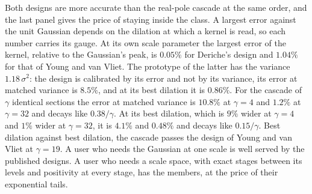 \begin{example}
Both designs are more accurate than the real-pole cascade at the same order, and the last
panel gives the price of staying inside the class. A largest error against the unit Gaussian
depends on the dilation at which a kernel is read, so each number carries its gauge. At its
own scale parameter the largest error of the kernel, relative to the Gaussian's peak, is
$0.05\%$ for Deriche's design and $1.04\%$ for that of Young and van Vliet. The prototype of
the latter has the variance $1.18\,\sigma^2$: the design is calibrated by its error and not by
its variance, its error at matched variance is $8.5\%$, and at its best dilation it is
$0.86\%$. For the cascade of $\gamma$ identical sections the error at matched variance is
$10.8\%$ at $\gamma = 4$ and $1.2\%$ at $\gamma = 32$ and decays like $0.38/\gamma$. At its
best dilation, which is $9\%$ wider at $\gamma = 4$ and $1\%$ wider at $\gamma = 32$, it is
$4.1\%$ and $0.48\%$ and decays like $0.15/\gamma$. Best dilation against best dilation, the
cascade passes the design of Young and van Vliet at $\gamma = 19$. A user who needs the Gaussian at one scale is well served by the published
designs. A user who needs a scale space, with exact stages between its levels and positivity
at every stage, has the \Matern{} members, at the price of their exponential tails.
\end{example}
